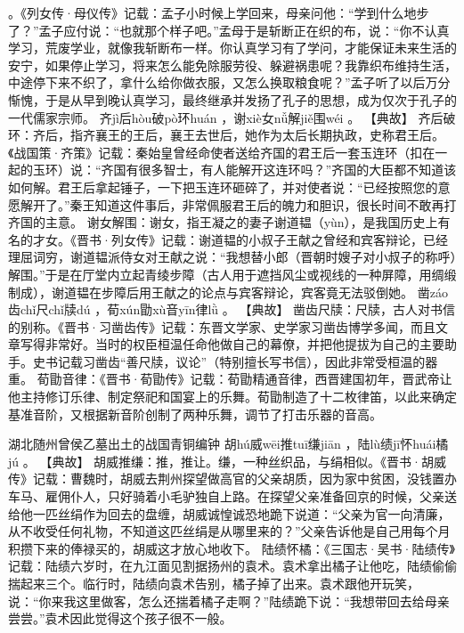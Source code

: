 \documentclass[12pt,UTF8]{ctexbook}
\begin{document}
。《列女传·母仪传》记载：孟子小时候上学回来，母亲问他：“学到什么地步了？”孟子应付说：“也就那个样子吧。”孟母于是斩断正在织的布，说：“你不认真学习，荒废学业，就像我斩断布一样。你认真学习有了学问，才能保证未来生活的安宁，如果停止学习，将来怎么能免除服劳役、躲避祸患呢？我靠织布维持生活，中途停下来不织了，拿什么给你做衣服，又怎么换取粮食呢？”孟子听了以后万分惭愧，于是从早到晚认真学习，最终继承并发扬了孔子的思想，成为仅次于孔子的一代儒家宗师。
齐jì后hòu破pò环huán
，谢xiè女nǚ解jiě围wéi
。
【典故】
齐后破环：齐后，指齐襄王的王后，襄王去世后，她作为太后长期执政，史称君王后。《战国策·齐策》记载：秦始皇曾经命使者送给齐国的君王后一套玉连环（扣在一起的玉环）说：“齐国有很多智士，有人能解开这连环吗？”齐国的大臣都不知道该如何解。君王后拿起锤子，一下把玉连环砸碎了，并对使者说：“已经按照您的意愿解开了。”秦王知道这件事后，非常佩服君王后的魄力和胆识，很长时间不敢再打齐国的主意。
谢女解围：谢女，指王凝之的妻子谢道韫（yùn），是我国历史上有名的才女。《晋书·列女传》记载：谢道韫的小叔子王献之曾经和宾客辩论，已经理屈词穷，谢道韫派侍女对王献之说：“我想替小郎（晋朝时嫂子对小叔子的称呼）解围。”于是在厅堂内立起青绫步障（古人用于遮挡风尘或视线的一种屏障，用绸缎制成），谢道韫在步障后用王献之的论点与宾客辩论，宾客竟无法驳倒她。
凿záo齿chǐ尺chǐ牍dú
，荀xún勖xù音yīn律lǜ
。
【典故】
凿齿尺牍：尺牍，古人对书信的别称。《晋书·习凿齿传》记载：东晋文学家、史学家习凿齿博学多闻，而且文章写得非常好。当时的权臣桓温任命他做自己的幕僚，并把他提拔为自己的主要助手。史书记载习凿齿“善尺牍，议论”（特别擅长写书信），因此非常受桓温的器重。
荀勖音律：《晋书·荀勖传》记载：荀勖精通音律，西晋建国初年，晋武帝让他主持修订乐律、制定祭祀和国宴上的乐舞。荀勖制造了十二枚律笛，以此来确定基准音阶，又根据新音阶创制了两种乐舞，调节了打击乐器的音高。

湖北随州曾侯乙墓出土的战国青铜编钟
胡hú威wēi推tuī缣jiān
，陆lù绩jī怀huái橘jú
。
【典故】
胡威推缣：推，推让。缣，一种丝织品，与绢相似。《晋书·胡威传》记载：曹魏时，胡威去荆州探望做高官的父亲胡质，因为家中贫困，没钱置办车马、雇佣仆人，只好骑着小毛驴独自上路。在探望父亲准备回京的时候，父亲送给他一匹丝绢作为回去的盘缠，胡威诚惶诚恐地跪下说道：“父亲为官一向清廉，从不收受任何礼物，不知道这匹丝绢是从哪里来的？”父亲告诉他是自己用每个月积攒下来的俸禄买的，胡威这才放心地收下。
陆绩怀橘：《三国志·吴书·陆绩传》记载：陆绩六岁时，在九江面见割据扬州的袁术。袁术拿出橘子让他吃，陆绩偷偷揣起来三个。临行时，陆绩向袁术告别，橘子掉了出来。袁术跟他开玩笑，说：“你来我这里做客，怎么还揣着橘子走啊？”陆绩跪下说：“我想带回去给母亲尝尝。”袁术因此觉得这个孩子很不一般。
\end{document}
